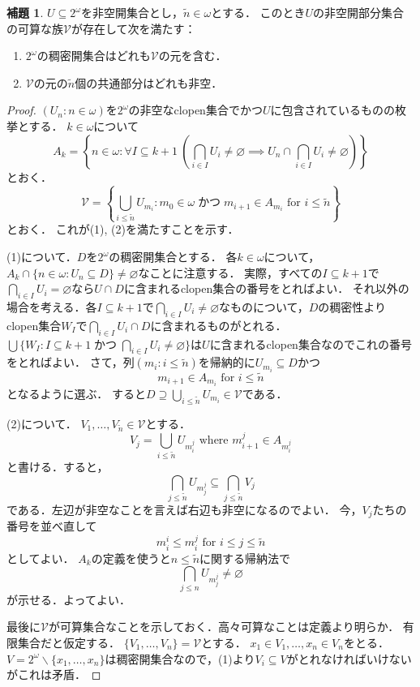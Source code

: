 \documentclass[uplatex,dvipdfmx]{jsarticle}
\newcommand{\AND}{\mathbin{\text{かつ}}}
\renewcommand\emptyset{\varnothing}
\renewcommand\subset{\subseteq}
\renewcommand{\setminus}{\smallsetminus}
\theoremstyle{definition}
\newtheorem{lem}[thm]{補題}
\theoremstyle{named}
\begin{document}
	\begin{lem}\label{opensetswithintersectionprop}
		$U \subseteq 2^\omega$を非空開集合とし，$\tilde{n} \in \omega$とする．
		このとき$U$の非空開部分集合の可算な族$\mathcal{V}$が存在して次を満たす：
		\begin{enumerate}
			\item $2^\omega$の稠密開集合はどれも$\mathcal{V}$の元を含む．
			\item $\mathcal{V}$の元の$\tilde{n}$個の共通部分はどれも非空．
		\end{enumerate}
	\end{lem}
	\begin{proof}
		$(U_n : n \in \omega)$を$2^\omega$の非空なclopen集合でかつ$U$に包含されているものの枚挙とする．
		$k \in \omega$について
		\[
		A_k = \left\{ n \in \omega : \forall I \subset k + 1\ \left(\bigcap_{i \in I} U_i \ne \emptyset \implies U_n \cap \bigcap_{i \in I} U_i \ne \emptyset \right)\right\}
		\]
		とおく．
		\[
		\mathcal{V} = \left\{ \bigcup_{i \le \tilde{n}} U_{m_i} : m_0 \in \omega \AND m_{i+1} \in A_{m_i} \text{ for $i \le \tilde{n}$} \right\}
		\]
		とおく．
		これが(1), (2)を満たすことを示す．
		
		(1)について．$D$を$2^\omega$の稠密開集合とする．
		各$k \in \omega$について，$A_k \cap \{ n \in \omega : U_n \subset D \} \ne \emptyset$なことに注意する．
		実際，すべての$I \subset k + 1$で$\bigcap_{i \in I} U_i = \emptyset$なら$U \cap D$に含まれるclopen集合の番号をとればよい．
		それ以外の場合を考える．各$I \subset k + 1$で$\bigcap_{i \in I} U_i \ne \emptyset$なものについて，$D$の稠密性よりclopen集合$W_I$で$\bigcap_{i \in I} U_i  \cap D$に含まれるものがとれる．$\bigcup \{W_I :  I \subset k + 1 \AND \bigcap_{i \in I} U_i \ne \emptyset \}$は$U$に含まれるclopen集合なのでこれの番号をとればよい．
		さて，列$( m_i : i \le \tilde{n})$を帰納的に$U_{m_i} \subset D$かつ
		\[
			m_{i+1} \in A_{m_i} \text{ for $i \le \tilde{n}$}
		\]
		となるように選ぶ．
		すると$D \supseteq \bigcup_{i \le \tilde{n}} U_{m_i} \in \mathcal{V}$である．
		
		(2)について．
		$V_1, \dots, V_{\tilde{n}} \in \mathcal{V}$とする．
		\[
		V_j = \bigcup_{i \le \tilde{n}} U_{m^j_i} \text{ where $m^j_{i+1} \in A_{m^j_i}$}
		\]
		と書ける．すると，
		\[
		\bigcap_{j \le \tilde{n}} U_{m^j_j} \subset \bigcap_{j \le \tilde{n}} V_j
		\]
		である．左辺が非空なことを言えば右辺も非空になるのでよい．
		今，$V_j$たちの番号を並べ直して
		\[
		m^i_i \le m^j_i \text{ for $i\le j \le \tilde{n}$}
		\]
		としてよい．
		$A_k$の定義を使うと$n\le\tilde{n}$に関する帰納法で
		\[
		\bigcap_{j \le n} U_{m^j_j} \ne \emptyset
		\]
		が示せる．よってよい．
		
		最後に$\mathcal{V}$が可算集合なことを示しておく．高々可算なことは定義より明らか．
		有限集合だと仮定する．
		$\{V_1, \dots, V_n\} = \mathcal{V}$とする．
		$x_1 \in V_1, \dots, x_n \in V_n$をとる．
		$V = 2^\omega \setminus \{x_1, \dots, x_n \}$は稠密開集合なので，(1)より$V_i \subset V$がとれなければいけないがこれは矛盾．
	\end{proof}
	
\end{document}
